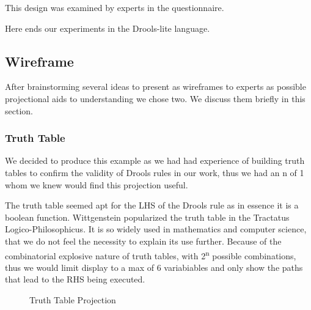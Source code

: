 This design was examined by experts in the questionnaire.

Here ends our experiments in the Drools-lite language.

\subsection{Wireframe}

After brainstorming several ideas to present as wireframes to experts as possible projectional aids to understanding we chose two.
We discuss them briefly in this section.

\subsubsection{Truth Table}
We decided to produce this example as we had had experience of building truth tables to confirm the validity of Drools rules in our work, thus we had an n of 1 whom we knew would find this projection useful.

The truth table seemed apt for the LHS of the Drools rule as in essence it is a boolean function.
Wittgenstein popularized the truth table in the Tractatus Logico-Philosophicus\cite{wittgenstein2013tractatus}.
It is so widely used in mathematics and computer science, that we do not feel the necessity to explain its use further.
Because of the combinatorial explosive nature of truth tables, with 2\textsuperscript{n} possible combinations, thus we would limit display to a max of 6 variabiables and only show the paths that lead to the RHS being executed.

\begin{figure}[h]
    \centering
    \caption{Truth Table Projection}
    \label{fig:TruthTableProjection}
\end{figure}


